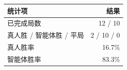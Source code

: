 \begin{tabular}{lr}
\toprule
统计项 & 结果 \\
\midrule
已完成局数 & 12 / 10 \\
真人胜 / 智能体胜 / 平局 & 2 / 10 / 0 \\
真人胜率 & 16.7\% \\
智能体胜率 & 83.3\% \\
\bottomrule
\end{tabular}
